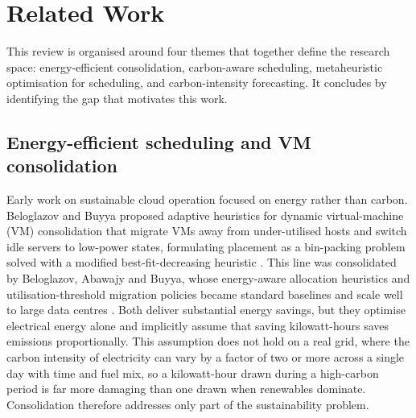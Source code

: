 \documentclass[12pt,a4paper]{article}
\begin{document}
\section{Related Work}\label{sec:related}
This review is organised around four themes that together define the research space: energy-efficient
consolidation, carbon-aware scheduling, metaheuristic optimisation for scheduling, and carbon-intensity
forecasting. It concludes by identifying the gap that motivates this work.

\subsection{Energy-efficient scheduling and VM consolidation}
Early work on sustainable cloud operation focused on energy rather than carbon. Beloglazov and Buyya proposed
adaptive heuristics for dynamic virtual-machine (VM) consolidation that migrate VMs away from under-utilised
hosts and switch idle servers to low-power states, formulating placement as a bin-packing problem solved with
a modified best-fit-decreasing heuristic \cite{beloglazov2012optimal}. This line was consolidated by
Beloglazov, Abawajy and Buyya, whose energy-aware allocation heuristics and utilisation-threshold migration
policies became standard baselines and scale well to large data centres \cite{beloglazov2012energy}. Both
deliver substantial energy savings, but they optimise electrical energy alone and implicitly assume that
saving kilowatt-hours saves emissions proportionally. This assumption does not hold on a real grid, where the
carbon intensity of electricity can vary by a factor of two or more across a single day with time and fuel
mix, so a kilowatt-hour drawn during a high-carbon period is far more damaging than one drawn when renewables
dominate. Consolidation therefore addresses only part of the sustainability problem.
\end{document}
